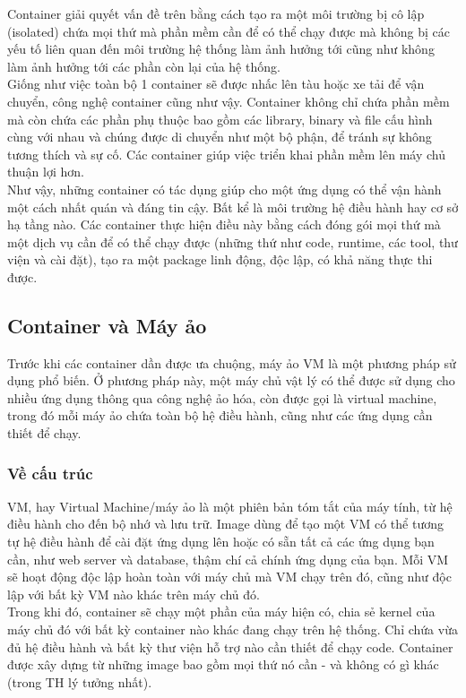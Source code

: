 \documentclass[12pt,a4paper]{report}
\begin{document}
		Container giải quyết vấn đề trên bằng cách tạo ra một môi trường bị cô lập (isolated) chứa mọi thứ mà phần mềm cần để có thể chạy được mà không bị các yếu tố liên quan đến môi trường hệ thống làm ảnh hưởng tới cũng như không làm ảnh hưởng tới các phần còn lại của hệ thống.\\
		
		Giống như việc toàn bộ 1 container sẽ được nhấc lên tàu hoặc xe tải để vận chuyển, công nghệ container cũng như vậy. Container không chỉ chứa phần mềm mà còn chứa các phần phụ thuộc bao gồm các library, binary và file cấu hình cùng với nhau và chúng được di chuyển như một bộ phận, để tránh sự không tương thích và sự cố. Các container giúp việc triển khai phần mềm lên máy chủ thuận lợi hơn.\\
		
		Như vậy, những container có tác dụng giúp cho một ứng dụng có thể vận hành một cách nhất quán và đáng tin cậy. Bất kể là môi trường hệ điều hành hay cơ sở hạ tầng nào. Các container thực hiện điều này bằng cách đóng gói mọi thứ mà một dịch vụ cần để có thể chạy được (những thứ như code, runtime, các tool, thư viện và cài đặt), tạo ra một package linh động, độc lập, có khả năng thực thi được.
			\subsection{Container và Máy ảo}
		\hspace{0.6cm}Trước khi các container dần được ưa chuộng, máy ảo VM là một phương pháp sử dụng phổ biến. Ở phương pháp này, một máy chủ vật lý có thể được sử dụng cho nhiều ứng dụng thông qua công nghệ ảo hóa, còn được gọi là virtual machine, trong đó mỗi máy ảo chứa toàn bộ hệ điều hành, cũng như các ứng dụng cần thiết để chạy.
				\subsubsection{Về cấu trúc}
		\hspace{0.6cm}VM, hay Virtual Machine/máy ảo là một phiên bản tóm tắt của máy tính, từ hệ điều hành cho đến bộ nhớ và lưu trữ. Image dùng để tạo một VM có thể tương tự hệ điều hành để cài đặt ứng dụng lên hoặc có sẵn tất cả các ứng dụng bạn cần, như web server và database, thậm chí cả chính ứng dụng của bạn. Mỗi VM sẽ hoạt động độc lập hoàn toàn với máy chủ mà VM chạy trên đó, cũng như độc lập với bất kỳ VM nào khác trên máy chủ đó.\\

		Trong khi đó, container sẽ chạy một phần của máy hiện có, chia sẻ kernel của máy chủ đó với bất kỳ container nào khác đang chạy trên hệ thống. Chỉ chứa vừa đủ hệ điều hành và bất kỳ thư viện hỗ trợ nào cần thiết để chạy code. Container được xây dựng từ những image bao gồm mọi thứ nó cần - và không có gì khác (trong TH lý tưởng nhất).
\end{document}
